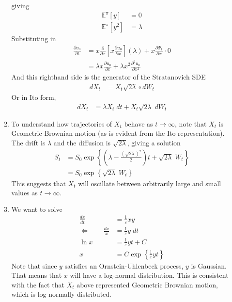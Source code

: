 \documentclass[12pt]{article}
\theoremstyle{plain}
\theoremstyle{definition}
\theoremstyle{remark}
\begin{document}
\begin{enumerate}
\begin{enumerate}
        giving
        \begin{align*}
          \mathbb{E}^\pi[y] &= 0 \\
          \mathbb{E}^\pi[y^2] &= \lambda
        \end{align*}
        Substituting in
        \begin{align*}
          \frac{\partial u_0}{\partial t}
          &=
           x\frac{\partial }{\partial x}
          \left[ x\frac{\partial u_0}{\partial x} \right]
          \left(\lambda\right)
          + x\frac{\partial \Psi_1}{\partial x}
          \cdot 0 \\
          &=
          \lambda x\frac{\partial u_0}{\partial x}
          + \lambda x^2\frac{\partial^2 u_0}{\partial x^2}
        \end{align*}
        And this righthand side is the generator of the
        Stratanovich SDE
        \begin{align*}
          dX_t &= X_t \sqrt{2\lambda} \circ dW_t
        \end{align*}
        Or in Ito form,
        \begin{align*}
          dX_t &= \lambda X_t \; dt + X_t \sqrt{2\lambda} \; dW_t
        \end{align*}

    \item %
      To understand how trajectories of $X_t$ behave as $t\rightarrow
      \infty$, note that $X_t$ is Geometric Brownian motion (as is
      evident from the Ito representation). The drift is $\lambda$ and
      the diffusion is $\sqrt{2\lambda}$, giving a solution
      \begin{align*}
        S_t
        &= S_0
        \exp
        \left\{
          \left(\lambda - \frac{(\sqrt{2\lambda})^2}{2}\right)t
          + \sqrt{2\lambda} \; W_t
        \right\} \\
        &= S_0
        \exp
        \left\{
          \sqrt{2\lambda} \; W_t
        \right\}
      \end{align*}
      This suggests that $X_t$ will oscillate between arbitrarily large
      and small values as $t\rightarrow \infty$.

    \item %
      We want to solve
      \begin{align*}
        \frac{dx}{dt}
        &= \frac{1}{\varepsilon} xy \\
        \Leftrightarrow \qquad
        \frac{dx}{x}
        &= \frac{1}{\varepsilon} y \; dt \\
        \ln x
          &= \frac{1}{\varepsilon} y t + C \\
        x &= C\exp\left\{ \frac{1}{\varepsilon} y t \right\}
      \end{align*}
      Note that since $y$ satisfies an Ornstein-Uhlenbeck process, $y$
      is Gaussian. That means that $x$ will have a log-normal
      distribution. This is consistent with the fact that $X_t$ above
      represented Geometric Brownian motion, which is log-normally distributed.


\end{enumerate}
\end{enumerate}
\end{document}
